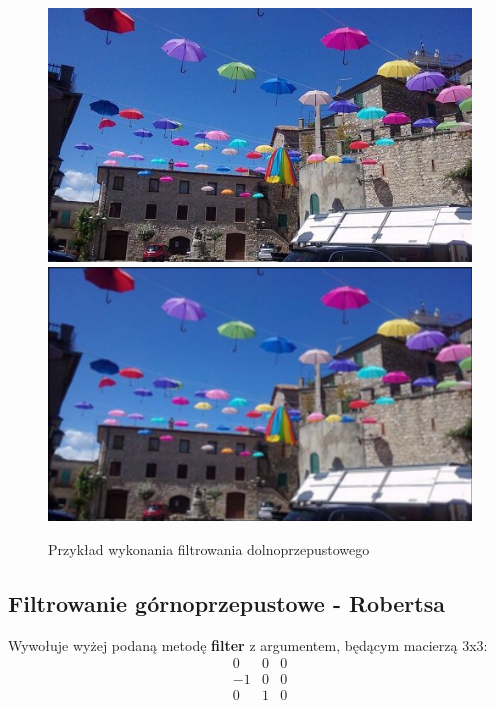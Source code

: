 \documentclass{article}
\begin{document}
\begin{figure}[!ht]
	\includegraphics[scale=1.2]{img/rgb-obraz1}
	\includegraphics[scale=1.2]{img/filtrowanie/rgb-dolnoprzepustowe}
	\caption{Przykład wykonania filtrowania dolnoprzepustowego}
	\label{fig21}	
	\end{figure}	
	
	
	\subsection{Filtrowanie górnoprzepustowe - Robertsa}
	Wywołuje wyżej podaną metodę \textbf{filter} z argumentem, będącym macierzą 3x3:
	\begin{equation*}
	\begin{matrix}
	0 & 0 & 0 \\
	-1 & 0 & 0 \\
	0 & 1 & 0
	\end{matrix}
	\end{equation*}
		
\end{document}
